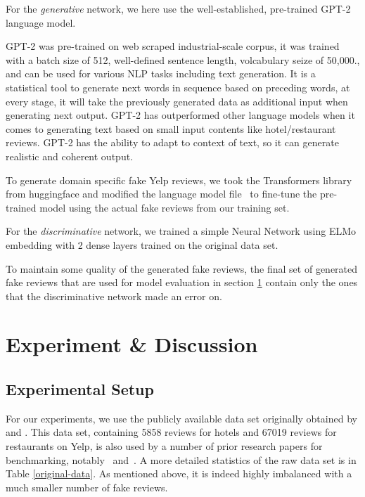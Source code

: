 \documentclass[conference]{IEEEtran} %
\theoremstyle{plain}
\theoremstyle{definition}
\begin{document}
For the \textit{generative} network, we here use the well-established, pre-trained GPT-2 language model.

GPT-2 was pre-trained on web scraped industrial-scale corpus, it was trained with a batch size of 512, well-defined sentence length, volcabulary seize of 50,000., and can be used for various NLP tasks including text generation. It is a statistical tool to generate next words in sequence based on preceding words, at every stage, it will take the previously generated data as additional input when generating next output. GPT-2 has outperformed other language models when it comes to generating text based on small input contents like hotel/restaurant reviews. GPT-2 has the ability to adapt to context of text, so it can generate realistic and coherent output. 

To generate domain specific fake Yelp reviews, we took the Transformers library from huggingface and modified the language model file~\cite{gpt2guide} to fine-tune the pre-trained model using the actual fake reviews from our training set.

For the \textit{discriminative} network, we trained a simple Neural Network using ELMo embedding with 2 dense layers trained on the original data set. 

To maintain some quality of the generated fake reviews, the final set of generated fake reviews that are used for model evaluation in section \ref{exp} contain only the ones that the discriminative network made an error on. 



\section{Experiment \& Discussion}
\label{exp}

\subsection{Experimental Setup}
For our experiments, we use the publicly available data set originally obtained by \cite{mukherjee2013fake} and \cite{mukherjee2013yelp}.
This data set, containing 5858 reviews for hotels and 67019 reviews for restaurants on Yelp, is also used by a number of prior research papers for benchmarking, notably~\cite{wang2017handling} and~\cite{Tang2020}.
 A more detailed statistics of the raw data set is in Table \ref{original-data}. As mentioned above, it is indeed highly imbalanced with a much smaller number of fake reviews.
\end{document}

